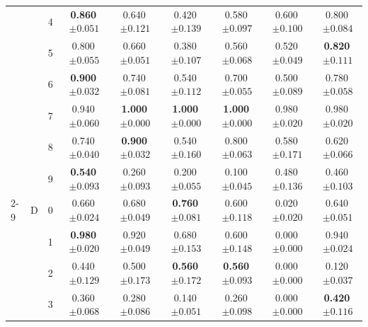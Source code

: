 \begin{longtable}{lllcccccc}
 &  & 4 & \textbf{0.860}$\,{\scriptstyle\pm0.051}$ & 0.640$\,{\scriptstyle\pm0.121}$ & 0.420$\,{\scriptstyle\pm0.139}$ & 0.580$\,{\scriptstyle\pm0.097}$ & 0.600$\,{\scriptstyle\pm0.100}$ & 0.800$\,{\scriptstyle\pm0.084}$ \\
 &  & 5 & 0.800$\,{\scriptstyle\pm0.055}$ & 0.660$\,{\scriptstyle\pm0.051}$ & 0.380$\,{\scriptstyle\pm0.107}$ & 0.560$\,{\scriptstyle\pm0.068}$ & 0.520$\,{\scriptstyle\pm0.049}$ & \textbf{0.820}$\,{\scriptstyle\pm0.111}$ \\
 &  & 6 & \textbf{0.900}$\,{\scriptstyle\pm0.032}$ & 0.740$\,{\scriptstyle\pm0.081}$ & 0.540$\,{\scriptstyle\pm0.112}$ & 0.700$\,{\scriptstyle\pm0.055}$ & 0.500$\,{\scriptstyle\pm0.089}$ & 0.780$\,{\scriptstyle\pm0.058}$ \\
 &  & 7 & 0.940$\,{\scriptstyle\pm0.060}$ & \textbf{1.000}$\,{\scriptstyle\pm0.000}$ & \textbf{1.000}$\,{\scriptstyle\pm0.000}$ & \textbf{1.000}$\,{\scriptstyle\pm0.000}$ & 0.980$\,{\scriptstyle\pm0.020}$ & 0.980$\,{\scriptstyle\pm0.020}$ \\
 &  & 8 & 0.740$\,{\scriptstyle\pm0.040}$ & \textbf{0.900}$\,{\scriptstyle\pm0.032}$ & 0.540$\,{\scriptstyle\pm0.160}$ & 0.800$\,{\scriptstyle\pm0.063}$ & 0.580$\,{\scriptstyle\pm0.171}$ & 0.620$\,{\scriptstyle\pm0.066}$ \\
 &  & 9 & \textbf{0.540}$\,{\scriptstyle\pm0.093}$ & 0.260$\,{\scriptstyle\pm0.093}$ & 0.200$\,{\scriptstyle\pm0.055}$ & 0.100$\,{\scriptstyle\pm0.045}$ & 0.480$\,{\scriptstyle\pm0.136}$ & 0.460$\,{\scriptstyle\pm0.103}$ \\
\cmidrule(lr){2-9}
 & D & 0 & 0.660$\,{\scriptstyle\pm0.024}$ & 0.680$\,{\scriptstyle\pm0.049}$ & \textbf{0.760}$\,{\scriptstyle\pm0.081}$ & 0.600$\,{\scriptstyle\pm0.118}$ & 0.020$\,{\scriptstyle\pm0.020}$ & 0.640$\,{\scriptstyle\pm0.051}$ \\
 &  & 1 & \textbf{0.980}$\,{\scriptstyle\pm0.020}$ & 0.920$\,{\scriptstyle\pm0.049}$ & 0.680$\,{\scriptstyle\pm0.153}$ & 0.600$\,{\scriptstyle\pm0.148}$ & 0.000$\,{\scriptstyle\pm0.000}$ & 0.940$\,{\scriptstyle\pm0.024}$ \\
 &  & 2 & 0.440$\,{\scriptstyle\pm0.129}$ & 0.500$\,{\scriptstyle\pm0.173}$ & \textbf{0.560}$\,{\scriptstyle\pm0.172}$ & \textbf{0.560}$\,{\scriptstyle\pm0.093}$ & 0.000$\,{\scriptstyle\pm0.000}$ & 0.120$\,{\scriptstyle\pm0.037}$ \\
 &  & 3 & 0.360$\,{\scriptstyle\pm0.068}$ & 0.280$\,{\scriptstyle\pm0.086}$ & 0.140$\,{\scriptstyle\pm0.051}$ & 0.260$\,{\scriptstyle\pm0.098}$ & 0.000$\,{\scriptstyle\pm0.000}$ & \textbf{0.420}$\,{\scriptstyle\pm0.116}$ \\

\end{longtable}
